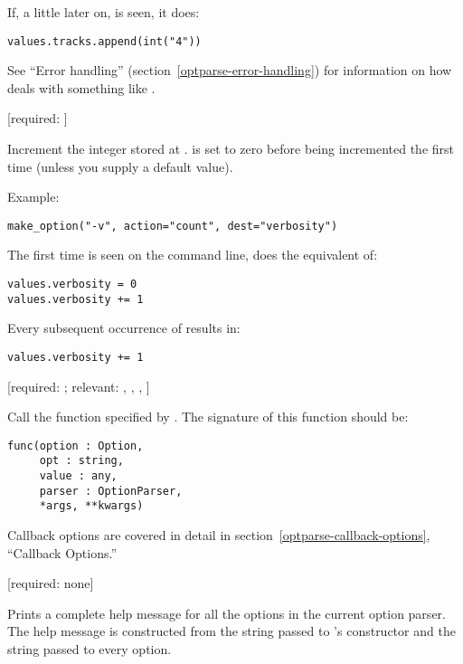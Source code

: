 \begin{definitions}
If, a little later on,  is seen, it does:

\begin{verbatim}
values.tracks.append(int("4"))
\end{verbatim}

See ``Error handling'' (section~\ref{optparse-error-handling}) for
information on how  deals with something like
.

 [required: ]

Increment the integer stored at .  is set to zero
before being incremented the first time (unless you supply a default
value).

Example:

\begin{verbatim}
make_option("-v", action="count", dest="verbosity")
\end{verbatim}

The first time  is seen on the command line,
 does the equivalent of:

\begin{verbatim}
values.verbosity = 0
values.verbosity += 1
\end{verbatim}

Every subsequent occurrence of  results in:

\begin{verbatim}
values.verbosity += 1
\end{verbatim}

 [required: ;
      relevant: , , ,
      ]

Call the function specified by .  The signature of
this function should be:

\begin{verbatim}
func(option : Option,
     opt : string,
     value : any,
     parser : OptionParser,
     *args, **kwargs)
\end{verbatim}

Callback options are covered in detail in
section~\ref{optparse-callback-options}, ``Callback Options.''

 [required: none]

Prints a complete help message for all the options in the current
option parser.  The help message is constructed from the 
string passed to 's constructor and the 
string passed to every option.


\end{definitions}
